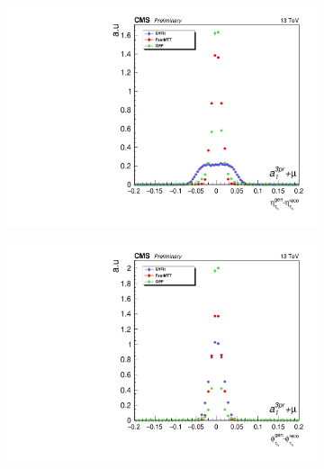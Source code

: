 \begin{figure}[!ht]
  \begin{subfigure}[b]{0.5\linewidth}
    \centering
    \includegraphics[width=\linewidth]{Chapitre6/Images/Eta.pdf} 
    \caption{} 
  \end{subfigure}%
  \begin{subfigure}[b]{0.5\linewidth}
    \centering
    \includegraphics[width=\linewidth]{Chapitre6/Images/Phi.pdf} 
    \caption{} 
  \end{subfigure} 


\end{figure}
